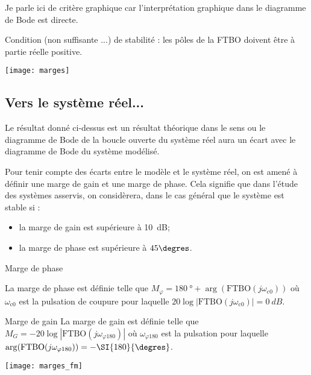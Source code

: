  \begin{remarque}
 Je parle ici de critère graphique car l'interprétation graphique dans le diagramme de Bode est directe.
 \end{remarque}
 
\begin{resultat}
Condition (non suffisante ...) de stabilité : les pôles de la FTBO doivent être à partie réelle positive.
\end{resultat}
 
\begin{center}
\texttt{[image: marges]}
\end{center} 
\subsection{Vers le système réel...}

Le résultat donné ci-dessus est un résultat théorique dans le sens ou le diagramme de Bode de la boucle ouverte du système réel aura un écart avec le diagramme de Bode du système modélisé. 


\begin{resultat}[Marges]
Pour tenir compte des écarts entre le modèle et le système réel, on est amené à définir une marge de gain et une marge de phase. Cela signifie que dans l'étude des systèmes asservis, on considèrera, dans le cas général que le système est stable si :
\begin{itemize}
\item la marge de gain est supérieure à \SI{10}{dB};
\item la marge de phase est supérieure à $45\degres$.
\end{itemize}
\end{resultat}

\begin{minipage}[c]{.58\linewidth}
\begin{defi}{Marge de phase}

La marge de phase est définie telle que $M_\varphi= \SI{180}{\degree} + \arg\left(\text{FTBO}(j\omega_{\text{c0}})\right)$ où $\omega_{\text{c0}}$ est la pulsation de coupure pour laquelle $20\log|\text{FTBO}\left(j\omega_{\text{c0}}\right)|=\SI{0}{dB}$.
\end{defi}

\begin{defi}{Marge de gain}
La marge de gain est définie telle
que $M_G = -20\log|\text{FTBO} (j\omega_{\varphi 180})|$
où $\omega_{\varphi 180}$ est la pulsation pour laquelle $\arg(\text{FTBO}(j\omega_{ \varphi 180}))= -\SI{180}{\degres}$.
\end{defi}
\end{minipage}\hfill
\begin{minipage}[c]{.4\linewidth}
\begin{center}
\texttt{[image: marges\_fm]}
\end{center}
\end{minipage}


